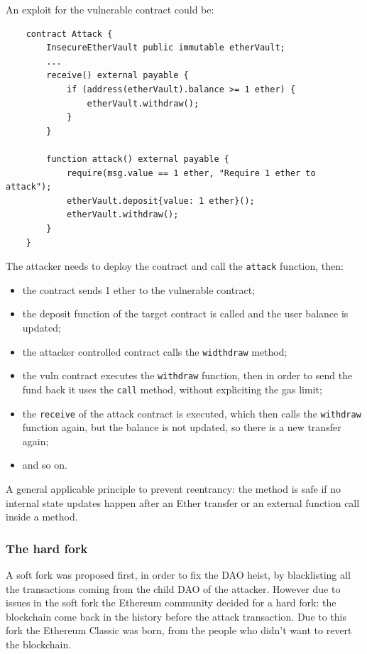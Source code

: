 An exploit for the vulnerable contract could be:
\begin{verbatim}
    contract Attack {
        InsecureEtherVault public immutable etherVault;
        ...
        receive() external payable {
            if (address(etherVault).balance >= 1 ether) {
                etherVault.withdraw();
            }
        }

        function attack() external payable {
            require(msg.value == 1 ether, "Require 1 ether to attack");
            etherVault.deposit{value: 1 ether}();
            etherVault.withdraw();
        }
    }
\end{verbatim}
The attacker needs to deploy the contract and call the \verb|attack| function, then:
\begin{itemize}
    \item the contract sends 1 ether to the vulnerable contract;
    \item the deposit function of the target contract is called and the user balance is updated;
    \item the attacker controlled contract calls the \verb|widthdraw| method;
    \item the vuln contract executes the \verb|withdraw| function, then in order to send the fund back it uses the \verb|call| method, without expliciting the gas limit;
    \item the \verb|receive| of the attack contract is executed, which then calls the \verb|withdraw| function again, but the balance is not updated, so there is a new transfer again;
    \item and so on.
\end{itemize}

A general applicable principle to prevent reentrancy: the method is safe if no internal state updates happen after an Ether transfer or an external function call inside a method.

\subsubsection{The hard fork}
A soft fork was proposed first, in order to fix the DAO heist, by blacklisting all the transactions coming from the child DAO of the attacker.
However due to issues in the soft fork the Ethereum community decided for a hard fork: the blockchain come back in the history before the attack transaction.
Due to this fork the Ethereum Classic was born, from the people who didn't want to revert the blockchain.

